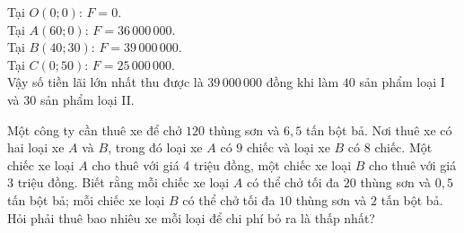 \begin{bt}
{\begin{center}
		\end{center}
		Tại $O(0;0)$: $F=0$.\\
		Tại $A(60;0)$: $F=36\,000\,000$.\\
		Tại $B(40;30)$: $F=39\,000\,000$.\\
		Tại $C(0;50)$: $F=25\,000\,000$.\\
		Vậy số tiền lãi lớn nhất thu được là $39\,000\,000$ đồng khi làm $40$ sản phẩm loại I và $30$ sản phẩm loại II.}
\end{bt}

\begin{bt}%
	Một công ty cần thuê xe để chở $120$ thùng sơn và $6{,}5$ tấn bột bả. Nơi thuê xe có hai loại xe $A$ và $B$, trong đó loại xe $A$ có $9$ chiếc và loại xe $B$ có $8$ chiếc. Một chiếc xe loại $A$ cho thuê với giá 4 triệu đồng, một chiếc xe loại $B$ cho thuê với giá 3 triệu đồng. Biết rằng mỗi chiếc xe loại $A$ có thể chở tối đa $20$ thùng sơn và $0{,}5$ tấn bột bả; mỗi chiếc xe loại $B$ có thể chở tối đa $10$ thùng sơn và $2$ tấn bột bả. Hỏi phải thuê bao nhiêu xe mỗi loại để chi phí bỏ ra là thấp nhất?
\end{bt}
